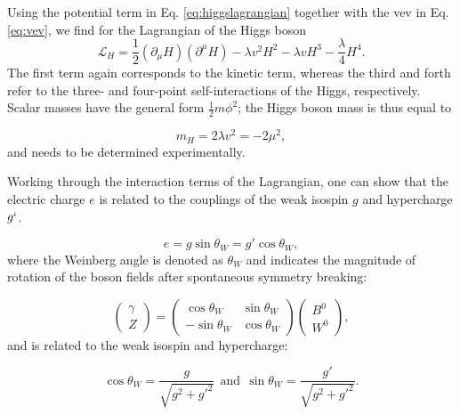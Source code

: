 \noindent Using the potential term in Eq. \ref{eq:higgslagrangian} together with the vev in Eq. \ref{eq:vev}, we find for the Lagrangian of the Higgs boson
\begin{equation}
\mathcal{L}_H = \frac{1}{2}\left(\partial_\mu H\right)\left(\partial^\mu H\right) - \lambda v^2 H^2 - \lambda v H^3 - \frac{\lambda}{4}H^4.
\end{equation}
The first term again corresponds to the kinetic term, whereas the third and forth refer to the three- and four-point self-interactions of the Higgs, respectively. Scalar masses have the general form $\frac{1}{2}m\phi^2$; the Higgs boson mass is thus equal to 

\begin{equation}
m_H = 2\lambda v^2 = - 2\mu^2,
\end{equation}
and needs to be determined experimentally.

Working through the interaction terms of the Lagrangian, one can show that the electric charge $e$  is related to the couplings of the weak isospin $g$ and hypercharge $g`$.

\begin{equation}
\label{eq:weinbergangle}
e = g \sin \theta_{W} = g' \cos \theta_W,
\end{equation} 
where the Weinberg angle is denoted as $\theta_W$ and indicates the magnitude of rotation of the boson fields after spontaneous symmetry breaking:

\begin{equation}
\begin{pmatrix} \gamma \\ Z \end{pmatrix} = 
\begin{pmatrix} \cos{\theta_W} & \sin{\theta_W} \\ -\sin{\theta_W} & \cos{\theta_W} \end{pmatrix} \begin{pmatrix} B^0 \\ W^0 \end{pmatrix},
\end{equation}
and is related to the weak isospin and hypercharge:

\begin{equation}
\cos \theta_W = \frac{g}{\sqrt{g^2 + g'^2}} \ \ \textrm{and} \ \ \sin \theta_W = \frac{g'}{\sqrt{g^2 + g'^2}}.
\end{equation}



